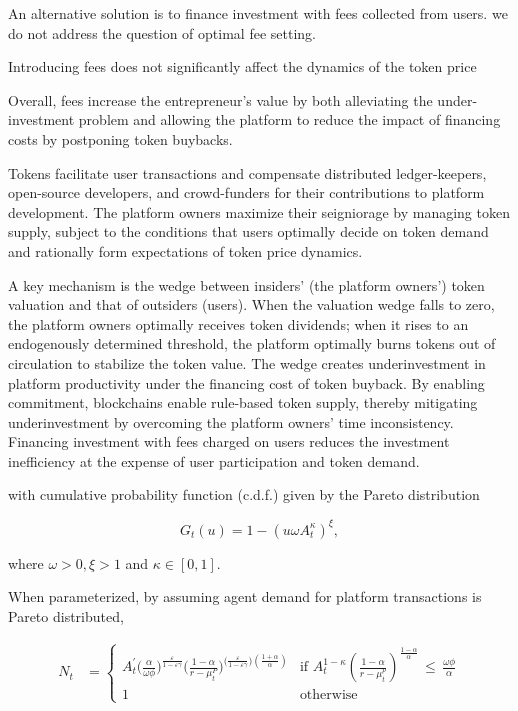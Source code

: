 {An alternative solution is to finance investment with fees collected from users. we do not address the question of optimal fee setting.

Introducing fees does not significantly affect the dynamics of the token price

Overall, fees increase the entrepreneur's value by both alleviating the under-investment problem and allowing the platform to reduce the impact of financing costs by postponing token buybacks.

Tokens facilitate user transactions and compensate distributed ledger-keepers, open-source developers, and crowd-funders for their contributions to platform development. The platform owners maximize their seigniorage by managing token supply, subject to the conditions that users optimally decide on token demand and rationally form expectations of token price dynamics.

A key mechanism is the wedge between insiders' (the platform owners') token valuation and that of outsiders (users). When the valuation wedge falls to zero, the platform owners optimally receives token dividends; when it rises to an endogenously determined threshold, the platform optimally burns tokens out of circulation to stabilize the token value. The wedge creates underinvestment in platform productivity under the financing cost of token buyback. By enabling commitment, blockchains enable rule-based token supply, thereby mitigating underinvestment by overcoming the platform owners' time inconsistency. Financing investment with fees charged on users reduces the investment inefficiency at the expense of user participation and token demand.

with cumulative probability function (c.d.f.) given by the Pareto distribution

\begin{equation}
    G_{t}(u)=1-\left({u \omega A_{t}^{\kappa}}\right)^{\xi},
\end{equation}

where $\omega>0, \xi > 1$ and $\kappa \in [0, 1]$.

When parameterized, by assuming agent demand for platform transactions is Pareto distributed,
               
        \begin{align}
        
        N_{t} &=
               \begin{cases}

               A_{t}^{\prime}\biggl({\frac{\alpha}{\omega\phi}}\biggr)^{\frac{\varepsilon}{1-\varepsilon\gamma}}\biggl({\frac{1-\alpha}{r-\mu_{t}^{P}}}\biggr)^{\bigl({\frac{\varepsilon}{1-\varepsilon\gamma}}\bigr)({\frac{1+\alpha}{\alpha}})}  & \text{if } A_{t}^{1-\kappa}\left(\frac{1{-}{\alpha}}{r{-}{\mu}_{t}^{p}}\right)^{\frac{1{-}{\alpha}}{\alpha}}\,\leq\,\frac{\omega\phi}{\alpha} \\
               1 & \text{otherwise}
               

\end{cases}
\end{align}}
